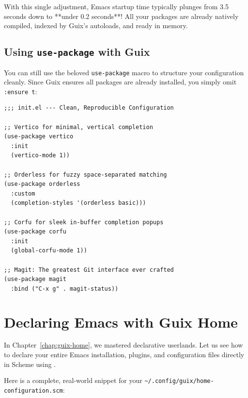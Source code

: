 With this single adjustment, Emacs startup time typically plunges from 3.5 seconds down to **under 0.2 seconds**! All your packages are already natively compiled, indexed by Guix's autoloads, and ready in memory.

\subsection{Using \texttt{use-package} with Guix}

You can still use the beloved \texttt{use-package} macro to structure your configuration cleanly. Since Guix ensures all packages are already installed, you simply omit \texttt{:ensure t}:

\begin{lstlisting}[style=guixscheme]
;;; init.el --- Clean, Reproducible Configuration

;; Vertico for minimal, vertical completion
(use-package vertico
  :init
  (vertico-mode 1))

;; Orderless for fuzzy space-separated matching
(use-package orderless
  :custom
  (completion-styles '(orderless basic)))

;; Corfu for sleek in-buffer completion popups
(use-package corfu
  :init
  (global-corfu-mode 1))

;; Magit: The greatest Git interface ever crafted
(use-package magit
  :bind ("C-x g" . magit-status))
\end{lstlisting}

\section{Declaring Emacs with Guix Home}

In Chapter~\ref{chap:guix-home}, we mastered declarative userlands. Let us see how to declare your entire Emacs installation, plugins, and configuration files directly in Scheme using .

Here is a complete, real-world snippet for your \texttt{\textasciitilde/.config/guix/home-configuration.scm}:

